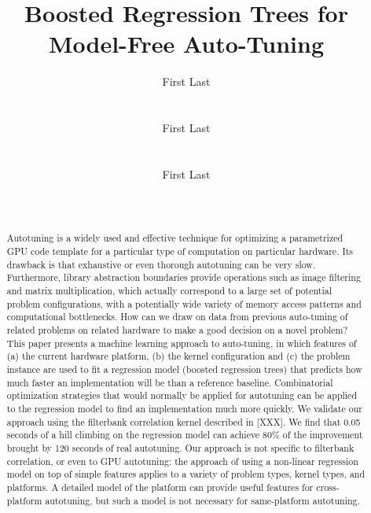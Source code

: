 \documentclass{sig-alternate}
\title{Boosted Regression Trees for Model-Free Auto-Tuning}
\author{
\alignauthor First Last\\
\affaddr{Affiliation line 1}\\
\affaddr{Affiliation line 2}\\
\email{anon@mail.com}
\alignauthor First Last\\
\affaddr{Affiliation line 1}\\
\affaddr{Affiliation line 2}\\
\email{anon@mail.com}
\alignauthor First Last\\
\affaddr{Affiliation line 1}\\
\affaddr{Affiliation line 2}\\
\email{anon@mail.com}
}
\begin{document}
\maketitle

\begin{abstract}

Autotuning is a widely used and effective technique for optimizing a
parametrized GPU code template for a particular type of computation on
particular hardware.
Its drawback is that exhaustive or even thorough autotuning can be very slow.
Furthermore, library abstraction boundaries provide operations such as image
filtering and matrix multiplication, which actually correspond to a large set
of potential problem configurations, with a potentially wide variety of memory
access patterns and computational bottlenecks.
How can we draw on data from previous auto-tuning of related problems on related hardware to make a
good decision on a novel problem?
This paper presents a machine learning approach to auto-tuning, in
which features of
(a) the current hardware platform,
(b) the kernel configuration
and (c) the problem instance are used to fit a regression model (boosted regression trees) that predicts
how much faster an implementation will be than a reference baseline.
Combinatorial optimization strategies that would normally be applied for autotuning can be applied to the regression model to find an implementation much more quickly.
We validate our approach using the filterbank correlation kernel described in [XXX].
We find that 0.05 seconds of a hill climbing on the regression model can achieve 80\% of the improvement brought by 120 seconds of real autotuning.
Our approach is not specific to filterbank correlation, or even to GPU autotuning: the approach of using a non-linear regression model on top of simple features applies to a variety of problem types, kernel types, and platforms.
A detailed model of the platform can provide useful features for cross-platform autotuning, but such a model is not necessary for same-platform autotuning.

\end{abstract}
\end{document}
